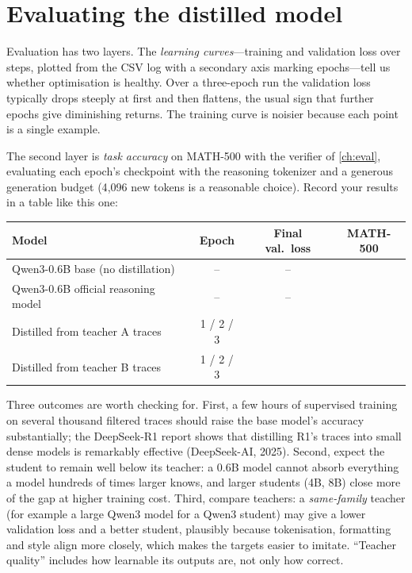 \section{Evaluating the distilled model}\label{sec:distill:eval}

Evaluation has two layers. The \emph{learning curves}---training and validation loss over steps,
plotted from the CSV log with a secondary axis marking epochs---tell us whether optimisation is
healthy. Over a three-epoch run the validation loss typically drops steeply at first and then
flattens, the usual sign that further epochs give diminishing returns. The training curve is noisier because each point is a single example.

The second layer is \emph{task accuracy} on MATH-500 with the verifier of \cref{ch:eval},
evaluating each epoch's checkpoint with the reasoning tokenizer and a generous generation budget
(4{,}096 new tokens is a reasonable choice). Record your results in a table like this one:
\begin{center}\small
\begin{tabular}{@{}lccc@{}}
\toprule
Model & Epoch & Final val.\ loss & MATH-500\\
\midrule
Qwen3-0.6B base (no distillation) & -- & -- & \\
Qwen3-0.6B official reasoning model & -- & -- & \\
Distilled from teacher A traces & 1 / 2 / 3 & & \\
Distilled from teacher B traces & 1 / 2 / 3 & & \\
\bottomrule
\end{tabular}
\end{center}

Three outcomes are worth checking for. First, a few hours of supervised training on several
thousand filtered traces should raise the base model's accuracy substantially; the DeepSeek-R1
report shows that distilling R1's traces into small dense models is remarkably effective
(DeepSeek-AI, 2025). Second, expect the student to remain well below its teacher: a 0.6B model
cannot absorb everything a model hundreds of times larger knows, and larger students (4B, 8B)
close more of the gap at higher training cost. Third, compare teachers: a \emph{same-family}
teacher (for example a large Qwen3 model for a Qwen3 student) may give a lower validation loss and
a better student, plausibly because tokenisation, formatting and style align more closely, which
makes the targets easier to imitate. ``Teacher quality'' includes how learnable its outputs are,
not only how correct.

